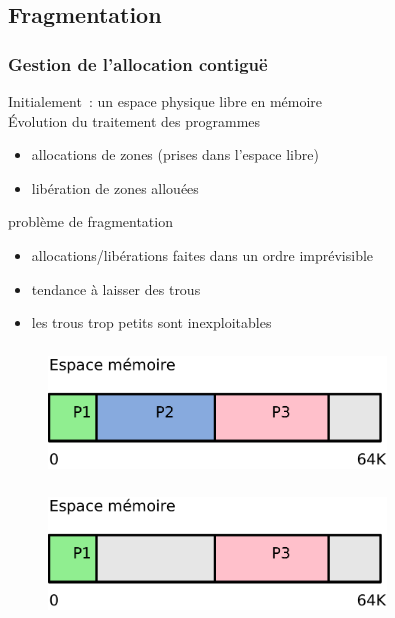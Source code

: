 \subsection{Fragmentation}
\begin{frame}
  \frametitle{Gestion de l'allocation contiguë}
  Initialement~: un espace physique \alert{libre} en mémoire\\
  \vspace{0.5cm}
  Évolution du traitement des programmes 
  \begin{itemize}
  \item \alert{allocations} de zones (prises dans l'espace libre)
  \item \alert{libération} de zones allouées 
  \end{itemize}
\vspace{0.5cm}
 problème de \alert{fragmentation}
\begin{itemize}
\item allocations/libérations faites dans un ordre imprévisible
\item tendance à laisser des \alert{trous}
\item les trous trop petits sont inexploitables
\end{itemize}
\end{frame}


\begin{frame}
\frametitle{\insertsubsection}
\begin{figure}[h]
  \includegraphics[width=0.8\textwidth]{fig2/frag-1}
\end{figure}
\end{frame}


\begin{frame}
\frametitle{\insertsubsection}
\begin{figure}[h]
  \includegraphics[width=0.8\textwidth]{fig2/frag-2}
\end{figure}
\end{frame}

